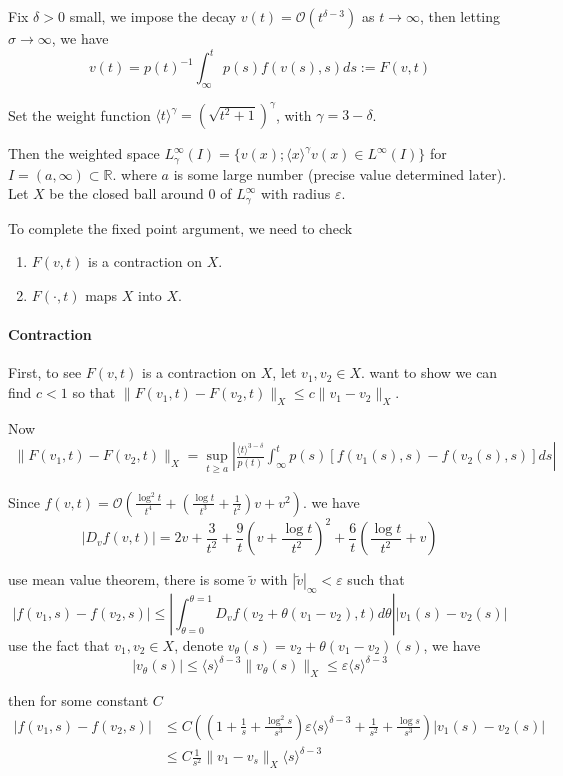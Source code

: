 \documentclass[letterpaper,11pt]{article}
\newcommand{\R}{\mathbb{R}}
\newcommand{\rmO}{\mathcal{O}}
\newcommand{\eps}{\varepsilon}
\numberwithin{equation}{section}
\theoremstyle{plain}
\begin{document}
Fix $\delta>0$ small, we impose the decay $v(t) = \rmO(t^{\delta-3})$ as $t \to \infty$, then letting $\sigma \to \infty$, we have
\[
v(t) = p(t)^{-1}\int_\infty^t p(s)f(v(s),s)ds := F(v,t)
\]


Set the weight function $\langle t \rangle^{\gamma} = (\sqrt{t^2+1})^{\gamma}$, with $\gamma= 3-\delta$.

Then the weighted space $L_\gamma^\infty (I) = \{ v(x);  \langle x\rangle^{\gamma} v(x) \in L^\infty(I) \}$ for $I = (a,\infty)\subset \R$. where $a$ is some large number (precise value determined later). Let $X$ be the closed ball around $0$ of $L_\gamma^\infty$ with radius $\eps$.


To complete the fixed point argument, we need to check
\begin{enumerate}

\item $F(v,t)$ is a contraction on $X$.
\item $F(\cdot,t)$ maps $X$ into $X$.

\end{enumerate}
\paragraph{Contraction}
First, to see $F(v,t)$ is a contraction on $X$, let $v_1,v_2 \in X$. want to show we can find $c<1$ so that $\| F(v_1,t) - F(v_2,t)\|_X \le c\|v_1-v_2\|_X$.

Now
\begin{align*}
\|F(v_1,t)-F(v_2,t)\|_X =\sup_{t\ge a} \left| \frac{\langle t\rangle^{3-\delta}}{p(t)} \int_\infty^t p(s)[f(v_1(s),s)-f(v_2(s),s)]ds \right|
\end{align*}


Since $f(v,t)=\rmO\left(\frac{\log^2 t}{t^4}+(\frac{\log t}{t^3}+\frac{1}{t^2}) v+v^2\right)$. we have
\[
|D_vf(v,t)| = 2v+\frac{3}{t^2} +\frac{9}{t}\left(v+\frac{\log t}{t^2}\right)^2+\frac{6}{t}\left(\frac{\log t}{t^2}+v\right)
\]

use mean value theorem, there is some $\tilde{v}$ with $|\tilde{v}|_\infty < \eps$ such that
\[
|f(v_1,s)-f(v_2,s)| \le \left| \int_{\theta=0}^{\theta=1} D_vf(v_2+\theta(v_1-v_2),t)d\theta \right||v_1(s)-v_2(s)|
\]
use the fact that $v_1,v_2 \in X$, denote $v_\theta(s)=v_2+\theta(v_1-v_2)(s)$, we have 
\[
|v_\theta(s)| \le \langle s\rangle^{\delta-3}\|v_\theta(s)\|_X \le \eps \langle s\rangle^{\delta-3}
\]

then for some constant $C$
\begin{align*}
|f(v_1,s)-f(v_2,s)| &\le C \left((1+\frac{1}{s}+\frac{\log^2 s}{s^3}) \eps \langle s\rangle^{\delta-3} + \frac{1}{s^2}+\frac{\log s}{s^3}\right)|v_1(s)-v_2(s)|\\
&\le C \frac{1}{s^2} \|v_1-v_s\|_X \langle s\rangle^{\delta-3}
\end{align*}
\end{document}
